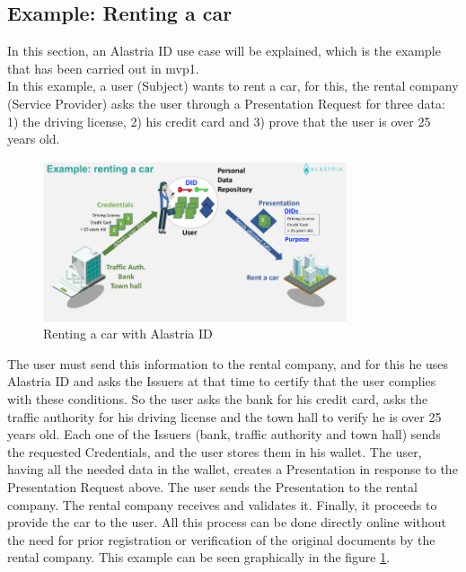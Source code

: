 \subsection{Example: Renting a car}
In this section, an Alastria ID use case will be explained, which is the example that has been carried out in \acrshort{mvp}1\cite{mvp1-car}.\\

In this example, a user (Subject) wants to rent a car, for this, the rental company (Service Provider) asks the user through a Presentation Request for three data: 1) the driving license, 2) his credit card and 3) prove that the user is over 25 years old.
\begin{figure}[h]
    \centering
    \includegraphics[width=0.8\textwidth]{images/Alastria ID/ala-rent-car.png}
    \caption{Renting a car with Alastria ID}
    \label{fig:ex-car}
\end{figure}
The user must send this information to the rental company, and for this he uses Alastria ID and asks the Issuers at that time to certify that the user complies with these conditions. So the user asks the bank for his credit card, asks the traffic authority for his driving license and the town hall to verify he is over 25 years old. Each one of the Issuers (bank, traffic authority and town hall) sends the requested Credentials, and the user stores them in his wallet. The user, having all the needed data in the wallet, creates a Presentation in response to the Presentation Request above. The user sends the Presentation to the rental company. The rental company receives and validates it. Finally, it proceeds to provide the car to the user. All this process can be done directly online without the need for prior registration or verification of the original documents by the rental company. This example can be seen graphically in the figure \ref{fig:ex-car}.\\

